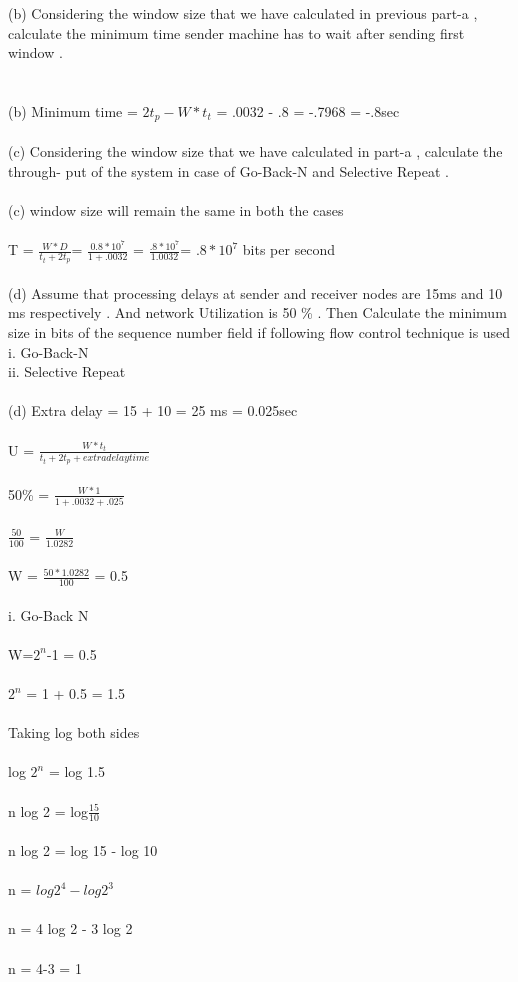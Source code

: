 \documentclass[a4paper,12pt]{article}
\begin{document}
(b) Considering the window size that we have calculated in previous part-a , calculate
the minimum time sender machine has to wait after sending first window .\\\\\\
(b) Minimum time = $2t_{p}- W*t_{t}$ = .0032 - .8 = -.7968 = -.8sec\\\\
(c) Considering the window size that we have calculated in part-a , calculate the through-
put of the system in case of Go-Back-N and Selective Repeat .\\\\
(c) window size will remain the same in both the cases\\\\
    T = $\frac{W*D}{t_{t}+2t_{p}}$= $\frac{0.8* 10^7 }{1 +.0032}$ = $\frac{.8 * 10^7}{1.0032}$= $.8*10^7$ bits per second\\\\
(d) Assume that processing delays at sender and receiver nodes are 15ms and 10 ms
respectively . And network Utilization is 50 \% .
 Then Calculate the minimum size
in bits of the sequence number field if following
flow control technique is used \\
i. Go-Back-N\\
ii. Selective Repeat\\\\
(d) Extra delay = 15 + 10 = 25 ms = 0.025sec\\\\
U = $\frac{W* t_{t}}{t_{t}+2t_{p}+ extra delay time}$ \\\\
  50\% =  $\frac{W* 1}{1 + .0032 + .025}$\\\\
  $\frac{50}{100}$ = $\frac{W}{1.0282}$\\\\
  W = $\frac{50*1.0282}{100}$ = 0.5\\\\
  i. Go-Back N\\\\
   W=$2^{n}$-1 = 0.5\\\\
   $2^{n}$ = 1 + 0.5 = 1.5\\\\
   Taking log both sides \\\\
   log $2^{n}$ = log 1.5\\\\
   n log 2 = log$\frac{15}{10}$\\\\
   n log 2 = log 15 - log 10 \\\\
   n = $log 2^{4} - log 2^{3}$\\\\
   n = 4 log 2 - 3 log 2 \\\\
   n = 4-3 = 1 \\\\
\end{document}
